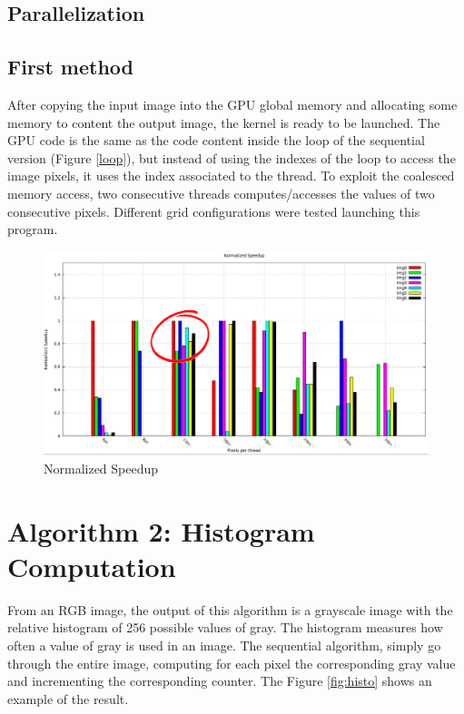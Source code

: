 \documentclass[a4paper]{article}
\begin{document}
\subsection{Parallelization}
\label{sec:p1}
\subsection{First method}
\label{sec:fm}
After copying the input image into the GPU global memory and allocating some memory to content the output image, the kernel is ready to be launched. The GPU code is the same as the code content inside the loop of the sequential version (Figure \ref{loop}), but instead of using the indexes of the loop to access the image pixels, it uses the index associated to the thread. To exploit the coalesced memory access, two consecutive threads computes/accesses the values of two consecutive pixels. Different grid configurations were tested launching this program. 




\begin{figure}[ht]
    \centering
    \includegraphics[width=0.9\linewidth]{res/histogram_darker}
    \caption{Normalized Speedup}
    \label{fig:norm_histo_darker}
\end{figure}
\FloatBarrier

\section{Algorithm 2: Histogram Computation}
\label{sec:hc}
From an RGB image, the output of this algorithm is a grayscale image with the relative histogram of 256 possible values of gray.
The histogram measures how often a value of gray is used in an image. The sequential algorithm, simply go through the entire image, computing for each pixel the corresponding gray value and incrementing the corresponding counter. The Figure \ref{fig:histo} shows an example of the result.
\end{document}
